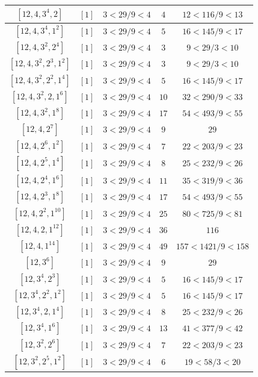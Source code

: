 \documentclass{article}%
\begin{document}
\begin{center}
\begin{longtable}{||c|c|c|c|c||}
$[12, 4, 3^{4}, 2]$ & $[1]$ & $3 < 29/9 < 4$ & $4$ & $12 < 116/9 < 13$ \\ \hline 
$[12, 4, 3^{4}, 1^{2}]$ & $[1]$ & $3 < 29/9 < 4$ & $5$ & $16 < 145/9 < 17$ \\ \hline 
$[12, 4, 3^{2}, 2^{4}]$ & $[1]$ & $3 < 29/9 < 4$ & $3$ & $9 < 29/3 < 10$ \\ \hline 
$[12, 4, 3^{2}, 2^{3}, 1^{2}]$ & $[1]$ & $3 < 29/9 < 4$ & $3$ & $9 < 29/3 < 10$ \\ \hline 
$[12, 4, 3^{2}, 2^{2}, 1^{4}]$ & $[1]$ & $3 < 29/9 < 4$ & $5$ & $16 < 145/9 < 17$ \\ \hline 
$[12, 4, 3^{2}, 2, 1^{6}]$ & $[1]$ & $3 < 29/9 < 4$ & $10$ & $32 < 290/9 < 33$ \\ \hline 
$[12, 4, 3^{2}, 1^{8}]$ & $[1]$ & $3 < 29/9 < 4$ & $17$ & $54 < 493/9 < 55$ \\ \hline 
$[12, 4, 2^{7}]$ & $[1]$ & $3 < 29/9 < 4$ & $9$ & $29$ \\ \hline 
$[12, 4, 2^{6}, 1^{2}]$ & $[1]$ & $3 < 29/9 < 4$ & $7$ & $22 < 203/9 < 23$ \\ \hline 
$[12, 4, 2^{5}, 1^{4}]$ & $[1]$ & $3 < 29/9 < 4$ & $8$ & $25 < 232/9 < 26$ \\ \hline 
$[12, 4, 2^{4}, 1^{6}]$ & $[1]$ & $3 < 29/9 < 4$ & $11$ & $35 < 319/9 < 36$ \\ \hline 
$[12, 4, 2^{3}, 1^{8}]$ & $[1]$ & $3 < 29/9 < 4$ & $17$ & $54 < 493/9 < 55$ \\ \hline 
$[12, 4, 2^{2}, 1^{10}]$ & $[1]$ & $3 < 29/9 < 4$ & $25$ & $80 < 725/9 < 81$ \\ \hline 
$[12, 4, 2, 1^{12}]$ & $[1]$ & $3 < 29/9 < 4$ & $36$ & $116$ \\ \hline 
$[12, 4, 1^{14}]$ & $[1]$ & $3 < 29/9 < 4$ & $49$ & $157 < 1421/9 < 158$ \\ \hline 
$[12, 3^{6}]$ & $[1]$ & $3 < 29/9 < 4$ & $9$ & $29$ \\ \hline 
$[12, 3^{4}, 2^{3}]$ & $[1]$ & $3 < 29/9 < 4$ & $5$ & $16 < 145/9 < 17$ \\ \hline 
$[12, 3^{4}, 2^{2}, 1^{2}]$ & $[1]$ & $3 < 29/9 < 4$ & $5$ & $16 < 145/9 < 17$ \\ \hline 
$[12, 3^{4}, 2, 1^{4}]$ & $[1]$ & $3 < 29/9 < 4$ & $8$ & $25 < 232/9 < 26$ \\ \hline 
$[12, 3^{4}, 1^{6}]$ & $[1]$ & $3 < 29/9 < 4$ & $13$ & $41 < 377/9 < 42$ \\ \hline 
$[12, 3^{2}, 2^{6}]$ & $[1]$ & $3 < 29/9 < 4$ & $7$ & $22 < 203/9 < 23$ \\ \hline 
$[12, 3^{2}, 2^{5}, 1^{2}]$ & $[1]$ & $3 < 29/9 < 4$ & $6$ & $19 < 58/3 < 20$ \\ \hline 

\end{longtable}
\end{center}
\end{document}
